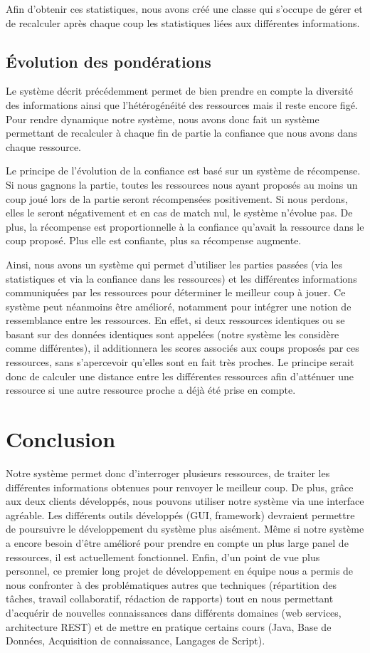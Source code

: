 \documentclass[a4paper,11pt]{article}
\begin{document}
Afin d'obtenir ces statistiques, nous avons créé une classe qui s'occupe de gérer et de recalculer après chaque coup les statistiques liées aux différentes informations.

\subsection{Évolution des pondérations}
\label{confiance}
Le système décrit précédemment permet de bien prendre en compte la diversité des informations ainsi que l'hétérogénéité des ressources mais il reste encore figé. Pour rendre dynamique notre système, nous avons donc fait un système permettant de recalculer à chaque fin de partie la confiance que nous avons dans chaque ressource.

Le principe de l'évolution de la confiance est basé sur un système de récompense. Si nous gagnons la partie, toutes les ressources nous ayant proposés au moins un coup joué lors de la partie seront récompensées positivement. Si nous perdons, elles le seront négativement et en cas de match nul, le système n'évolue pas. De plus, la récompense est proportionnelle à la confiance qu'avait la ressource dans le coup proposé. Plus elle est confiante, plus sa récompense augmente.

Ainsi, nous avons un système qui permet d'utiliser les parties passées (via les statistiques et via la confiance dans les ressources) et les différentes informations communiquées par les ressources pour déterminer le meilleur coup à jouer.
Ce système peut néanmoins être amélioré, notamment pour intégrer une notion de ressemblance entre les ressources. En effet, si deux ressources identiques ou se basant sur des données identiques sont appelées (notre système les considère comme différentes), il additionnera les scores associés aux coups proposés par ces ressources, sans s'apercevoir qu'elles sont en fait très proches. Le principe serait donc de calculer une \og distance \fg entre les différentes ressources afin d'atténuer une ressource si une autre ressource \og proche \fg a déjà été prise en compte.


\section{Conclusion} 
 Notre système permet donc d'interroger plusieurs ressources, de traiter les différentes informations obtenues pour renvoyer le meilleur coup. De plus, grâce aux deux clients développés, nous pouvons utiliser notre système via une interface agréable. Les différents outils développés (GUI, framework) devraient permettre de poursuivre le développement du système plus aisément. Même si notre système a encore besoin d'être amélioré pour prendre en compte un plus large panel de ressources, il est actuellement fonctionnel. Enfin, d'un point de vue plus personnel, ce premier long projet de développement en équipe nous a permis de nous confronter à des problématiques autres que techniques (répartition des tâches, travail collaboratif, rédaction de rapports) tout en nous permettant d'acquérir de nouvelles connaissances dans différents domaines (web services, architecture REST) et de mettre en pratique certains cours (Java, Base de Données, Acquisition de connaissance, Langages de Script).



\end{document}
